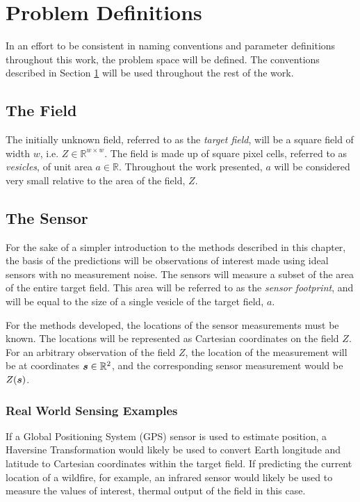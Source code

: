 \chapter{Problem Definitions} \label{ch:defs}
In an effort to be consistent in naming conventions and parameter definitions throughout this work, the problem space will be defined. The conventions described in Section \ref{ch:defs} will be used throughout the rest of the work.

\section{The Field}
The initially unknown field, referred to as the \textit{target field}, will be a square field of width $w$, i.e. $Z \in \mathbb{R}^{w \times w}$. The field is made up of square pixel cells, referred to as \textit{vesicles}, of unit area $a \in \mathbb{R}$. Throughout the work presented, $a$ will be considered very small relative to the area of the field, $Z$.

\section{The Sensor} \label{sec:sensor_measurements}
For the sake of a simpler introduction to the methods described in this chapter, the basis of the predictions will be observations of interest made using ideal sensors with no measurement noise. The sensors will measure a subset of the area of the entire target field. This area will be referred to as the \textit{sensor footprint}, and will be equal to the size of a single vesicle of the target field, $a$.

For the methods developed, the locations of the sensor measurements must be known. The locations will be represented as Cartesian coordinates on the field $Z$. For an arbitrary observation of the field $Z$, the location of the measurement will be at coordinates ${\it{\boldsymbol{s}}} \in \mathbb{R}^2$, and the corresponding sensor measurement would be $Z({\it{\boldsymbol{s}}})$.

\subsection{Real World Sensing Examples}
If a Global Positioning System (GPS) sensor is used to estimate position, a Haversine Transformation would likely be used to convert Earth longitude and latitude to Cartesian coordinates within the target field. If predicting the current location of a wildfire, for example, an infrared sensor would likely be used to measure the values of interest, thermal output of the field in this case.

